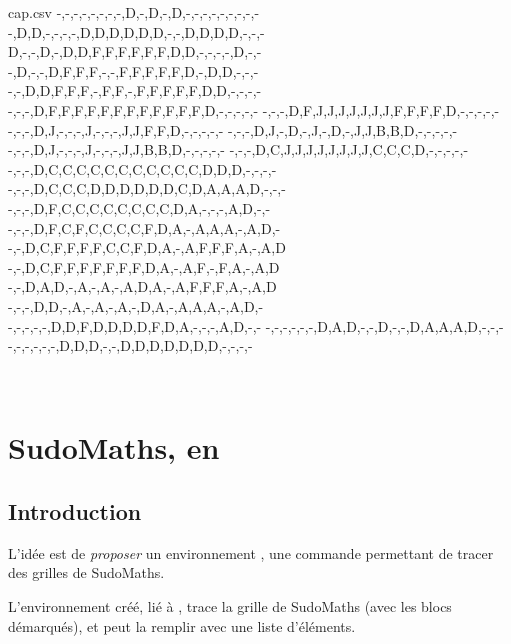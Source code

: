 \documentclass{article}
\begin{document}
\begin{codesortie}
\begin{filecontents*}[overwrite]{cap.csv}
-,-,-,-,-,-,-,-,D,-,D,-,D,-,-,-,-,-,-,-,-,-
-,D,D,-,-,-,-,D,D,D,D,D,D,-,-,D,D,D,D,-,-,-
D,-,-,D,-,D,D,F,F,F,F,F,F,D,D,-,-,-,-,D,-,-
-,D,-,-,D,F,F,F,-,-,F,F,F,F,F,D,-,D,D,-,-,-
-,-,D,D,F,F,F,-,F,F,-,F,F,F,F,F,D,D,-,-,-,-
-,-,-,D,F,F,F,F,F,F,F,F,F,F,F,F,D,-,-,-,-,-
-,-,-,D,F,J,J,J,J,J,J,J,F,F,F,F,D,-,-,-,-,-
-,-,-,D,J,-,-,-,J,-,-,-,J,J,F,F,D,-,-,-,-,-
-,-,-,D,J,-,D,-,J,-,D,-,J,J,B,B,D,-,-,-,-,-
-,-,-,D,J,-,-,-,J,-,-,-,J,J,B,B,D,-,-,-,-,-
-,-,-,D,C,J,J,J,J,J,J,J,J,C,C,C,D,-,-,-,-,-
-,-,-,D,C,C,C,C,C,C,C,C,C,C,C,D,D,D,-,-,-,-
-,-,-,D,C,C,C,D,D,D,D,D,D,C,D,A,A,A,D,-,-,-
-,-,-,D,F,C,C,C,C,C,C,C,C,D,A,-,-,-,A,D,-,-
-,-,-,D,F,C,F,C,C,C,C,F,D,A,-,A,A,A,-,A,D,-
-,-,D,C,F,F,F,F,C,C,F,D,A,-,A,F,F,F,A,-,A,D
-,-,D,C,F,F,F,F,F,F,F,D,A,-,A,F,-,F,A,-,A,D
-,-,D,A,D,-,A,-,A,-,A,D,A,-,A,F,F,F,A,-,A,D
-,-,-,D,D,-,A,-,A,-,A,-,D,A,-,A,A,A,-,A,D,-
-,-,-,-,-,D,D,F,D,D,D,D,F,D,A,-,-,-,A,D,-,-
-,-,-,-,-,-,D,A,D,-,-,D,-,-,D,A,A,A,D,-,-,-
-,-,-,-,-,-,D,D,D,-,-,D,D,D,D,D,D,D,-,-,-,-
\end{filecontents*}

\begin{center}
	\begin{tikzpicture}[x=0.35cm,y=0.35cm]
		\PLpixelart[codes=ABCDFJ,symboles={1,2,3,4,6,10},symb,style=\tiny\sffamily]{cap.csv}
	\end{tikzpicture}
	~~
	\begin{tikzpicture}[x=0.35cm,y=0.35cm]
		\PLpixelart[codes=ABCDFJ,couleurs={Red,Brown,Yellow,Black,Blue,Gray},correction]{cap.csv}
	\end{tikzpicture}
\end{center}
\end{codesortie}

\newpage

\section{SudoMaths, en \TikZ}\label{sudomaths}

\subsection{Introduction}

\begin{codeidee}
L'idée est de \textit{proposer} un environnement \TikZ, une commande permettant de tracer des grilles de SudoMaths.

L'environnement créé, lié à \TikZ, trace la grille de SudoMaths (avec les blocs démarqués), et peut la remplir avec une liste d'éléments.
\end{codeidee}
\end{document}
